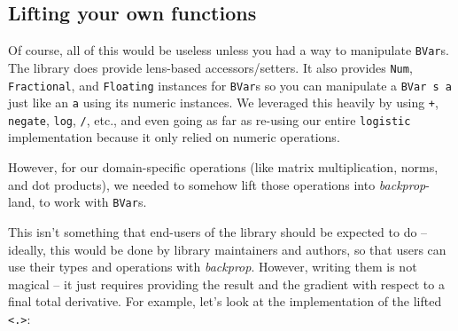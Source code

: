 \documentclass[]{article}
\newenvironment{Shaded}{}{}
\newcommand{\DataTypeTok}[1]{\textcolor[rgb]{0.56,0.13,0.00}{#1}}
\newcommand{\DecValTok}[1]{\textcolor[rgb]{0.25,0.63,0.44}{#1}}
\newcommand{\FunctionTok}[1]{\textcolor[rgb]{0.02,0.16,0.49}{#1}}
\newcommand{\KeywordTok}[1]{\textcolor[rgb]{0.00,0.44,0.13}{\textbf{#1}}}
\newcommand{\NormalTok}[1]{#1}
\newcommand{\OtherTok}[1]{\textcolor[rgb]{0.00,0.44,0.13}{#1}}
\begin{document}
\hypertarget{lifting-your-own-functions}{%
\subsection{Lifting your own functions}\label{lifting-your-own-functions}}

Of course, all of this would be useless unless you had a way to manipulate
\texttt{BVar}s. The library does provide lens-based accessors/setters. It also
provides \texttt{Num}, \texttt{Fractional}, and \texttt{Floating} instances for
\texttt{BVar}s so you can manipulate a \texttt{BVar\ s\ a} just like an
\texttt{a} using its numeric instances. We leveraged this heavily by using
\texttt{+}, \texttt{negate}, \texttt{log}, \texttt{/}, etc., and even going as
far as re-using our entire \texttt{logistic} implementation because it only
relied on numeric operations.

However, for our domain-specific operations (like matrix multiplication, norms,
and dot products), we needed to somehow lift those operations into
\emph{backprop}-land, to work with \texttt{BVar}s.

This isn't something that end-users of the library should be expected to do --
ideally, this would be done by library maintainers and authors, so that users
can use their types and operations with \emph{backprop}. However, writing them
is not magical -- it just requires providing the result and the gradient with
respect to a final total derivative. For example, let's look at the
implementation of the lifted \texttt{\textless{}.\textgreater{}}:

\begin{Shaded}
\end{Shaded}
\end{document}

